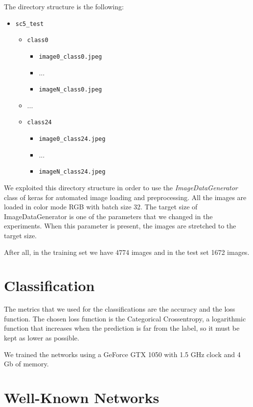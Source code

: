\documentclass[paper=a4, fontsize=11pt]{scrartcl} %
\numberwithin{equation}{section} %
\numberwithin{figure}{section} %
\numberwithin{table}{section} %
\begin{document}
The directory structure is the following:

\begin{itemize}
    \item \verb|sc5_test|
    \begin{itemize}
        \item \verb|class0|
        \begin{itemize}
            \item \verb|image0_class0.jpeg|
            \item ...
            \item \verb|imageN_class0.jpeg|
        \end{itemize}
        \item ...
        \item \verb|class24|
        \begin{itemize}
            \item \verb|image0_class24.jpeg|
            \item ...
            \item \verb|imageN_class24.jpeg|
        \end{itemize}
    \end{itemize}
\end{itemize}

We exploited this directory structure in order to use the {\em ImageDataGenerator} class of keras for automated image loading and preprocessing.
All the images are loaded in color mode RGB with batch size 32.
The target size of ImageDataGenerator is one of the parameters that we changed in the experiments. When this parameter is present, the images are stretched to the target size.

After all, in the training set we have 4774 images and in the test set 1672 images.

\section*{Classification}

The metrics that we used for the classifications are the accuracy and the loss function.
The chosen loss function is the Categorical Crossentropy, a logarithmic function that increases when the prediction is far from the label, so it must be kept as lower as possible.

We trained the networks using a GeForce GTX 1050 with 1.5 GHz clock and 4 Gb of memory.

\section*{Well-Known Networks}
\end{document}

